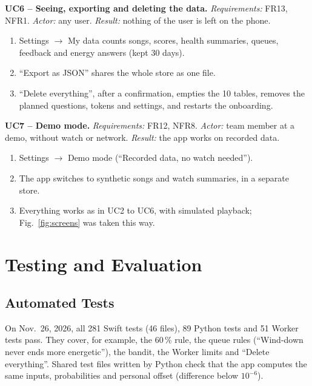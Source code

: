 \documentclass[conference]{IEEEtran}
\begin{document}
\textbf{UC6 -- Seeing, exporting and deleting the data.} \emph{Requirements:} FR13, NFR1. \emph{Actor:} any user. \emph{Result:} nothing of the user is left on the phone.
\begin{enumerate}
\item Settings $\rightarrow$ My data counts songs, scores, health summaries, queues, feedback and energy answers (kept 30 days).
\item ``Export as JSON'' shares the whole store as one file.
\item ``Delete everything'', after a confirmation, empties the 10 tables, removes the planned questions, tokens and settings, and restarts the onboarding.
\end{enumerate}

\textbf{UC7 -- Demo mode.} \emph{Requirements:} FR12, NFR8. \emph{Actor:} team member at a demo, without watch or network. \emph{Result:} the app works on recorded data.
\begin{enumerate}
\item Settings $\rightarrow$ Demo mode (``Recorded data, no watch needed'').
\item The app switches to synthetic songs and watch summaries, in a separate store.
\item Everything works as in UC2 to UC6, with simulated playback; Fig.~\ref{fig:screens} was taken this way.
\end{enumerate}

\section{Testing and Evaluation}\label{sec:eval}
\subsection{Automated Tests}\label{sec:tests}
On Nov.\ 26, 2026, all 281 Swift tests (46 files), 89 Python tests and 51 Worker tests pass. They cover, for example, the 60\,\% rule, the queue rules (``Wind-down never ends more energetic''), the bandit, the Worker limits and ``Delete everything''. Shared test files written by Python check that the app computes the same inputs, probabilities and personal offset (difference below $10^{-6}$).
\end{document}

